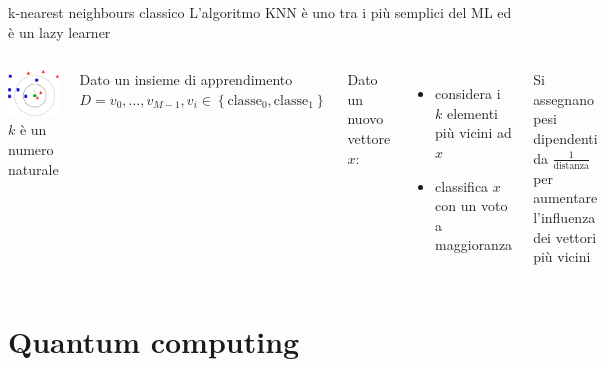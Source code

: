 \documentclass{beamer}
\begin{document}
    \begin{frame}{k-nearest neighbours classico}
        L'algoritmo KNN è uno tra i più semplici del ML ed è un lazy learner
        \begin{columns}
            \includegraphics[width=\textwidth]{gfx/KnnClassification.png}
            $k$ è un numero naturale

            Dato un insieme di apprendimento $D = v_0,\ldots,v_{M-1}, v_i\in\left\{ \text{classe}_0, \text{classe}_1 \right\}$

            Dato un nuovo vettore $x$: 
            \begin{itemize}
                \item considera i $k$ elementi più vicini ad $x$
                \item classifica $x$ con un voto a maggioranza
            \end{itemize}

            Si assegnano pesi dipendenti da $\frac{1}{\text{distanza}}$ per aumentare l'influenza 
            dei vettori più vicini

        \end{columns}
    \end{frame}

    \section{Quantum computing}
\end{document}
